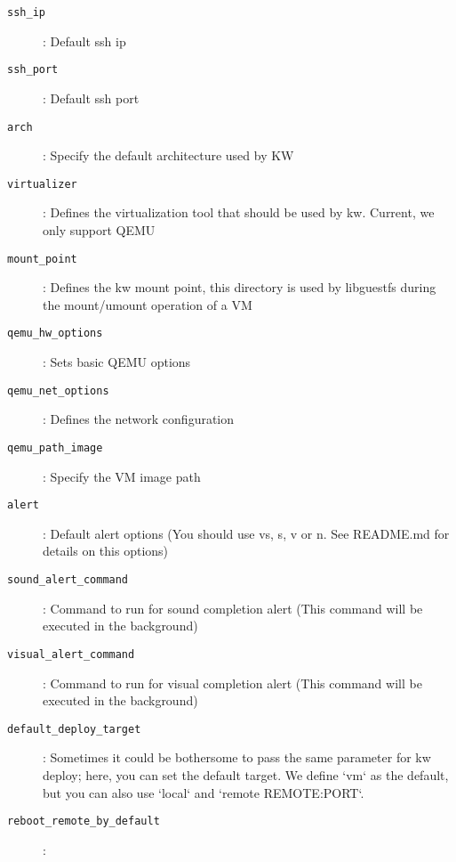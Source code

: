 \documentclass[10pt,landscape]{article}
\begin{document}
\begin{multicols}{3}
\begin{description}
    \item [\texttt{ssh\_ip}]:
    Default ssh ip
    \item [\texttt{ssh\_port}]:
    Default ssh port
    \item [\texttt{arch}]:
    Specify the default architecture used by KW
    \item [\texttt{virtualizer}]:
    Defines the virtualization tool that should be used by kw. Current, we only support QEMU
    \item [\texttt{mount\_point}]:
    Defines the kw mount point, this directory is used by libguestfs during the mount/umount operation of a VM
    \item [\texttt{qemu\_hw\_options}]:
    Sets basic QEMU options
    \item [\texttt{qemu\_net\_options}]:
    Defines the network configuration
    \item [\texttt{qemu\_path\_image}]:
    Specify the VM image path
    \item [\texttt{alert}]:
    Default alert options (You should use vs, s, v or n. See README.md for details on this options)
    \item [\texttt{sound\_alert\_command}]:
    Command to run for sound completion alert (This command will be executed in the background)
    \item [\texttt{visual\_alert\_command}]:
    Command to run for visual completion alert (This command will be executed in the background)
    \item [\texttt{default\_deploy\_target}]:
    Sometimes it could be bothersome to pass the same parameter for kw deploy; here, you can set the default target. We define `vm` as the default, but you can also use `local` and `remote REMOTE:PORT`.
    \item [\texttt{reboot\_remote\_by\_default}]:
\end{description}

\end{multicols}
\end{document}
